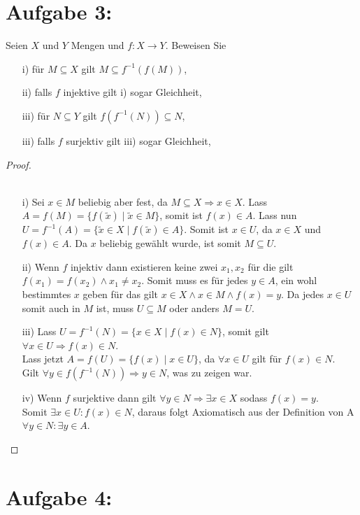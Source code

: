 \documentclass{exam}
\begin{document}
\section*{Aufgabe 3:}
Seien $X$ und $Y$ Mengen und $f : X \rightarrow Y$. Beweisen Sie
\begin{itemize}
	\item [i)] für $M \subseteq X$ gilt $M \subseteq f^{-1}(f(M))$,
	\item [ii)] falls $f$ injektive gilt i) sogar Gleichheit,
	\item [iii)] für $N \subseteq Y$ gilt $f(f^{-1}(N)) \subseteq N$,
	\item [iii)] falls $f$ surjektiv gilt iii) sogar Gleichheit,
\end{itemize}
\begin{proof} \\\
	\begin{itemize}
		\item [i)]
		      Sei $x \in M$ beliebig aber fest, da $M \subseteq X \Rightarrow x \in X$.
		      Lass $A = f(M) = \{f(\tilde{x}) \mid \tilde{x} \in M\}$, somit ist $f(x) \in A$.
		      Lass nun $U = f^{-1}(A) = \{\tilde{x} \in X \mid f(\tilde{x}) \in A\}$.
		      Somit ist $x \in U$, da $x \in X$ und $f(x) \in A$.
		      Da $x$ beliebig gewählt wurde, ist somit $M \subseteq U$. \checkmark
		\item [ii)]
		      Wenn $f$ injektiv dann existieren keine zwei $x_1, x_2$ für die gilt $f(x_1) = f(x_2) \land x_1 \not= x_2$.
		      Somit muss es für jedes $y \in A$, ein wohl bestimmtes $x$ geben für das gilt $x \in X \land x \in M \land f(x) = y$.
		      Da jedes $x \in U$ somit auch in $M$ ist, muss $U \subseteq M$ oder anders $M = U$. \checkmark
		\item [iii)]
		      Lass $U = f^{-1}(N) = \{x \in X \mid f(x) \in N\}$, somit gilt $\forall x \in U \Rightarrow f(x) \in N$. \\
		      Lass jetzt $A = f(U) = \{f(x) \mid x \in U\}$, da $\forall x \in U$ gilt für $f(x) \in N$. \\
		      Gilt $\forall y \in f(f^{-1}(N)) \Rightarrow y \in N$, was zu zeigen war. \checkmark
		\item [iv)]
		      Wenn $f$ surjektive dann gilt $\forall y \in N \Rightarrow \exists x \in X$ sodass $f(x) = y$. \\
		      Somit $\exists x \in U: f(x) \in N$, daraus folgt Axiomatisch aus der Definition von A $\forall y \in N: \exists y \in A$. \checkmark
	\end{itemize}
\end{proof}

\pagebreak

\section*{Aufgabe 4:}
\end{document}
